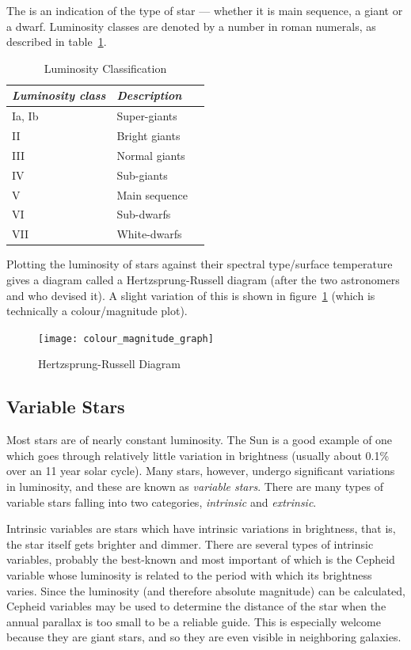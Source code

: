 The  is an indication of the type of star ---
whether it is main sequence, a giant or a dwarf. Luminosity classes are
denoted by a number in roman numerals, as described in table~\ref{tab:luminosityclass}.

\begin{table}[htb]
  \centering
  \begin{tabular}{lll}
\toprule
\emph{Luminosity class} & \emph{Description}\\\midrule
Ia, Ib & Super-giants\\
II     & Bright giants\\
III    & Normal giants\\
IV     & Sub-giants\\
V      & Main sequence\\
VI     & Sub-dwarfs\\
VII    & White-dwarfs\\
\bottomrule
\end{tabular}
\caption{Luminosity Classification}
\label{tab:luminosityclass}
\end{table}

Plotting the luminosity of stars against their spectral type/surface
temperature gives a diagram called a Hertzsprung-Russell diagram
(after the two astronomers  and  who devised it). A slight variation of this is shown
in figure~\ref{fig:colourmag} (which is technically a colour/magnitude
plot).

\begin{figure}[tp]
\centering\texttt{[image: colour\_magnitude\_graph]}
\caption{Hertzsprung-Russell Diagram}
\label{fig:colourmag}
\end{figure}

\subsection{Variable Stars}
\label{sec:Phenomena:variableStars}

Most stars are of nearly constant luminosity. The Sun is a good example
of one which goes through relatively little variation in brightness
(usually about 0.1\% over an 11 year solar cycle). Many stars, however,
undergo significant variations in luminosity, and these are known as
\emph{variable stars}. There are many types of variable stars falling
into two categories, \emph{intrinsic} and \emph{extrinsic}.

Intrinsic variables are stars which have intrinsic variations in
brightness, that is, the star itself gets brighter and dimmer. There
are several types of intrinsic variables, probably the best-known and
most important of which is the Cepheid variable whose luminosity is
related to the period with which its brightness varies. Since the
luminosity (and therefore absolute magnitude) can be calculated,
Cepheid variables may be used to determine the distance of the star
when the annual parallax is too small to be a reliable guide. This is
especially welcome because they are giant stars, and so they are even
visible in neighboring galaxies.

